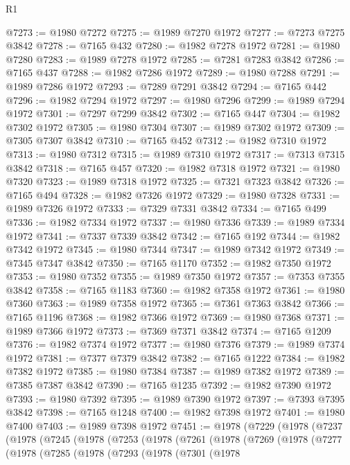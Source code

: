 \begin{lexlean}{R1}
\begin{coremodule}
@7273 := @1980 @7272
@7275 := @1989 @7270 @1972
@7277 := @7273 @7275 @3842
@7278 := @7165 @432
@7280 := @1982 @7278 @1972
@7281 := @1980 @7280
@7283 := @1989 @7278 @1972
@7285 := @7281 @7283 @3842
@7286 := @7165 @437
@7288 := @1982 @7286 @1972
@7289 := @1980 @7288
@7291 := @1989 @7286 @1972
@7293 := @7289 @7291 @3842
@7294 := @7165 @442
@7296 := @1982 @7294 @1972
@7297 := @1980 @7296
@7299 := @1989 @7294 @1972
@7301 := @7297 @7299 @3842
@7302 := @7165 @447
@7304 := @1982 @7302 @1972
@7305 := @1980 @7304
@7307 := @1989 @7302 @1972
@7309 := @7305 @7307 @3842
@7310 := @7165 @452
@7312 := @1982 @7310 @1972
@7313 := @1980 @7312
@7315 := @1989 @7310 @1972
@7317 := @7313 @7315 @3842
@7318 := @7165 @457
@7320 := @1982 @7318 @1972
@7321 := @1980 @7320
@7323 := @1989 @7318 @1972
@7325 := @7321 @7323 @3842
@7326 := @7165 @494
@7328 := @1982 @7326 @1972
@7329 := @1980 @7328
@7331 := @1989 @7326 @1972
@7333 := @7329 @7331 @3842
@7334 := @7165 @499
@7336 := @1982 @7334 @1972
@7337 := @1980 @7336
@7339 := @1989 @7334 @1972
@7341 := @7337 @7339 @3842
@7342 := @7165 @192
@7344 := @1982 @7342 @1972
@7345 := @1980 @7344
@7347 := @1989 @7342 @1972
@7349 := @7345 @7347 @3842
@7350 := @7165 @1170
@7352 := @1982 @7350 @1972
@7353 := @1980 @7352
@7355 := @1989 @7350 @1972
@7357 := @7353 @7355 @3842
@7358 := @7165 @1183
@7360 := @1982 @7358 @1972
@7361 := @1980 @7360
@7363 := @1989 @7358 @1972
@7365 := @7361 @7363 @3842
@7366 := @7165 @1196
@7368 := @1982 @7366 @1972
@7369 := @1980 @7368
@7371 := @1989 @7366 @1972
@7373 := @7369 @7371 @3842
@7374 := @7165 @1209
@7376 := @1982 @7374 @1972
@7377 := @1980 @7376
@7379 := @1989 @7374 @1972
@7381 := @7377 @7379 @3842
@7382 := @7165 @1222
@7384 := @1982 @7382 @1972
@7385 := @1980 @7384
@7387 := @1989 @7382 @1972
@7389 := @7385 @7387 @3842
@7390 := @7165 @1235
@7392 := @1982 @7390 @1972
@7393 := @1980 @7392
@7395 := @1989 @7390 @1972
@7397 := @7393 @7395 @3842
@7398 := @7165 @1248
@7400 := @1982 @7398 @1972
@7401 := @1980 @7400
@7403 := @1989 @7398 @1972
@7451 := @1978
    (@7229
      (@1978
        (@7237
          (@1978
            (@7245
              (@1978
                (@7253
                  (@1978
                    (@7261
                      (@1978
                        (@7269
                          (@1978
                            (@7277
                              (@1978
                                (@7285
                                  (@1978
                                    (@7293
                                      (@1978
                                        (@7301
                                          (@1978

\end{coremodule}
\end{lexlean}
